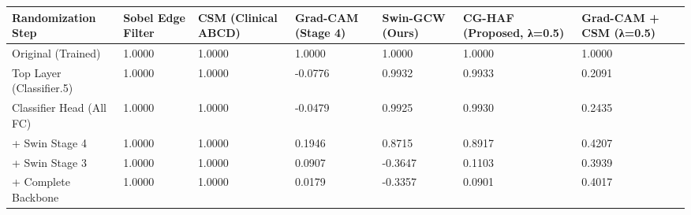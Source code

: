 \begin{tabular}{lllllll}
\toprule
Randomization Step & Sobel Edge Filter & CSM (Clinical ABCD) & Grad-CAM (Stage 4) & Swin-GCW (Ours) & CG-HAF (Proposed, λ=0.5) & Grad-CAM + CSM (λ=0.5) \\
\midrule
Original (Trained) & 1.0000 & 1.0000 & 1.0000 & 1.0000 & 1.0000 & 1.0000 \\
Top Layer (Classifier.5) & 1.0000 & 1.0000 & -0.0776 & 0.9932 & 0.9933 & 0.2091 \\
Classifier Head (All FC) & 1.0000 & 1.0000 & -0.0479 & 0.9925 & 0.9930 & 0.2435 \\
+ Swin Stage 4 & 1.0000 & 1.0000 & 0.1946 & 0.8715 & 0.8917 & 0.4207 \\
+ Swin Stage 3 & 1.0000 & 1.0000 & 0.0907 & -0.3647 & 0.1103 & 0.3939 \\
+ Complete Backbone & 1.0000 & 1.0000 & 0.0179 & -0.3357 & 0.0901 & 0.4017 \\
\bottomrule
\end{tabular}
